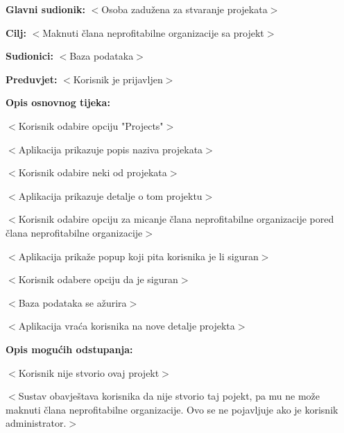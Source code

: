 					\noindent {}
					\begin{packed_item}

						\item \textbf{Glavni sudionik:} $<$Osoba zadužena za stvaranje projekata$>$
						\item \textbf{Cilj:} $<$Maknuti člana neprofitabilne organizacije sa projekt$>$
						\item \textbf{Sudionici:} $<$Baza podataka$>$
						\item \textbf{Preduvjet:} $<$Korisnik je prijavljen$>$
						\item \textbf{Opis osnovnog tijeka:}

						\item[] \begin{packed_enum}

							\item $<$Korisnik odabire opciju "Projects"$>$
							\item $<$Aplikacija prikazuje popis naziva projekata$>$
							\item $<$Korisnik odabire neki od projekata$>$
							\item $<$Aplikacija prikazuje detalje o tom projektu$>$
							\item $<$Korisnik odabire opciju za micanje člana neprofitabilne organizacije pored
							člana neprofitabilne organizacije$>$
							\item $<$Aplikacija prikaže popup koji pita korisnika je li siguran$>$
							\item $<$Korisnik odabere opciju da je siguran$>$
							\item $<$Baza podataka se ažurira$>$
							\item $<$Aplikacija vraća korisnika na nove detalje projekta$>$
						\end{packed_enum}

						\item \textbf{Opis mogućih odstupanja:}

						\item[] \begin{packed_item}

							\item[7.a] $<$Korisnik nije stvorio ovaj projekt$>$
							\item[] \begin{packed_enum}

								\item $<$Sustav obavještava korisnika da nije stvorio taj pojekt, pa mu
								ne može maknuti člana neprofitabilne organizacije.
								Ovo se ne pojavljuje ako je korisnik administrator.$>$

							\end{packed_enum}

						\end{packed_item}
					\end{packed_item}

